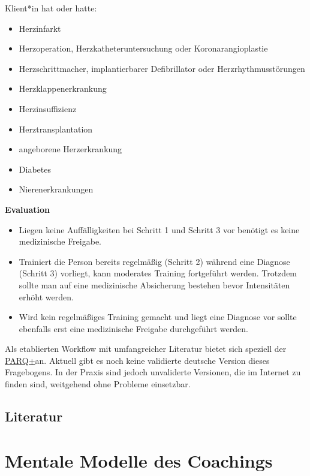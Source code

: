 \documentclass[
  letterpaper,
  DIV=11,
  numbers=noendperiod]{scrreprt}
\providecommand{\tightlist}{%
  \setlength{\itemsep}{0pt}\setlength{\parskip}{0pt}}
\begin{document}
Klient*in hat oder hatte:

\begin{itemize}
\tightlist
\item
  Herzinfarkt
\item
  Herzoperation, Herzkatheteruntersuchung oder Koronarangioplastie
\item
  Herzschrittmacher, implantierbarer Defibrillator oder
  Herzrhythmusstörungen
\item
  Herzklappenerkrankung
\item
  Herzinsuffizienz
\item
  Herztransplantation
\item
  angeborene Herzerkrankung
\item
  Diabetes
\item
  Nierenerkrankungen
\end{itemize}

\textbf{Evaluation}

\begin{itemize}
\item
  Liegen keine Auffälligkeiten bei Schritt 1 und Schritt 3 vor benötigt
  es keine medizinische Freigabe.
\item
  Trainiert die Person bereits regelmäßig (Schritt 2) während eine
  Diagnose (Schritt 3) vorliegt, kann moderates Training fortgeführt
  werden. Trotzdem sollte man auf eine medizinische Absicherung bestehen
  bevor Intensitäten erhöht werden.
\item
  Wird kein regelmäßiges Training gemacht und liegt eine Diagnose vor
  sollte ebenfalls erst eine medizinische Freigabe durchgeführt werden.
\end{itemize}

Als etablierten Workflow mit umfangreicher Literatur bietet sich
speziell der \href{https://eparmedx.com/?page_id=79}{PARQ+}an. Aktuell
gibt es noch keine validierte deutsche Version dieses Fragebogens. In
der Praxis sind jedoch unvaliderte Versionen, die im Internet zu finden
sind, weitgehend ohne Probleme einsetzbar.

\section{Literatur}\label{literatur-6}


\chapter{Mentale Modelle des
Coachings}\label{mentale-modelle-des-coachings}
\end{document}
